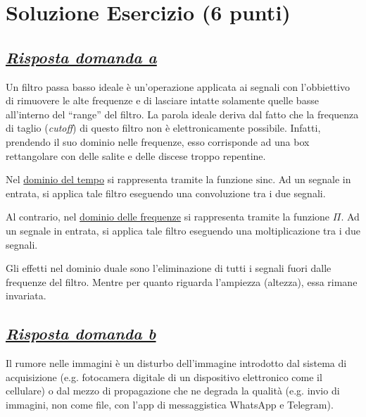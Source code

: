 \documentclass[a4paper]{article}
\newcommand{\dquotes}[1]{``#1''}
\begin{document}
	\section{Soluzione Esercizio (6 punti)}
	
	\subsection*{\textcolor{Green4}{\emph{\underline{Risposta domanda a}}}}
	
	Un filtro passa basso ideale è un'operazione applicata ai segnali con l'obbiettivo di rimuovere le alte frequenze e di lasciare intatte solamente quelle basse all'interno del \dquotes{range} del filtro. La parola ideale deriva dal fatto che la frequenza di taglio (\emph{cutoff}) di questo filtro non è elettronicamente possibile. Infatti, prendendo il suo dominio nelle frequenze, esso corrisponde ad una box rettangolare con delle salite e delle discese troppo repentine.\newline
	
	\noindent
	Nel \underline{dominio del tempo} si rappresenta tramite la funzione $\mathrm{sinc}$. Ad un segnale in entrata, si applica tale filtro eseguendo una convoluzione tra i due segnali.\newline
	
	\noindent	
	Al contrario, nel \underline{dominio delle frequenze} si rappresenta tramite la funzione $\Pi$. Ad un segnale in entrata, si applica tale filtro eseguendo una moltiplicazione tra i due segnali.\newline
	
	\noindent
	Gli effetti nel dominio duale sono l'eliminazione di tutti i segnali fuori dalle frequenze del filtro. Mentre per quanto riguarda l'ampiezza (altezza), essa rimane invariata.\newpage
	
	\subsection*{\textcolor{Green4}{\emph{\underline{Risposta domanda b}}}}
	
	Il rumore nelle immagini è un disturbo dell'immagine introdotto dal sistema di acquisizione (e.g. fotocamera digitale di un dispositivo elettronico come il cellulare) o dal mezzo di propagazione che ne degrada la qualità (e.g. invio di immagini, non come file, con l'app di messaggistica WhatsApp e Telegram).\newline
	
\end{document}
